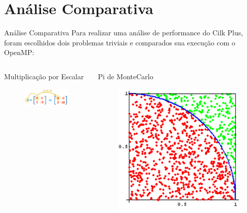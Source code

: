 \documentclass{beamer}
\begin{document}
\section{Análise Comparativa}
\begin{frame}{Análise Comparativa}
Para realizar uma análise de performance do Cilk Plus, foram escolhidos dois
problemas triviais e comparados sua execução com o OpenMP:
\vspace{0.5cm}
\begin{columns}[T]
\begin{column}{0.5\textwidth}
\centering
Multiplicação por Escalar
\begin{figure}
	\includegraphics[scale=0.5]{./img/escalar}
\end{figure}
\end{column}
\begin{column}{0.5\textwidth}
\centering
Pi de MonteCarlo
\begin{figure}
	\includegraphics[scale=0.15]{./img/pi}
\end{figure}
\end{column}
\end{columns}
\end{frame}
\end{document}
